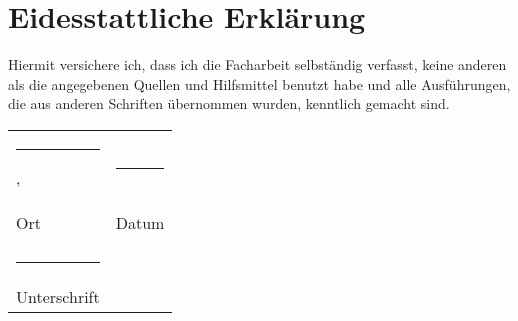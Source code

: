 \documentclass[
    12pt,
    smallheadings,
    ]{scrreprt}
\begin{document}
\chapter*{Eidesstattliche Erklärung}

Hiermit versichere ich, dass ich die Facharbeit selbständig verfasst,
keine anderen als die angegebenen Quellen und Hilfsmittel benutzt
habe und alle Ausführungen, die aus anderen Schriften übernommen wurden,
kenntlich gemacht sind.

\vspace{2.5cm}


\begin{tabular}{ll}
{\footnotesize \rule{0.4\textwidth}{0.3pt},} & {\footnotesize \rule{0.2\textwidth}{0.3pt}}\tabularnewline
{\footnotesize Ort} & {\footnotesize Datum}\tabularnewline
 & \tabularnewline
{\footnotesize \rule{0.4\textwidth}{0.3pt}} & \tabularnewline
{\footnotesize Unterschrift} & \tabularnewline
\end{tabular}
\end{document}
